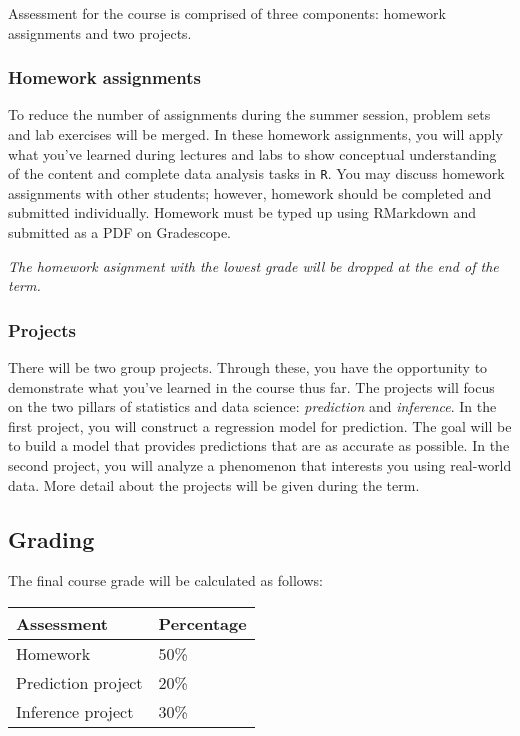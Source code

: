 \documentclass[
  letterpaper,
  DIV=11,
  numbers=noendperiod]{scrartcl}
\begin{document}
Assessment for the course is comprised of three components: homework
assignments and two projects.

\hypertarget{homework-assignments}{%
\subsubsection{Homework assignments}\label{homework-assignments}}

To reduce the number of assignments during the summer session, problem
sets and lab exercises will be merged. In these homework assignments,
you will apply what you've learned during lectures and labs to show
conceptual understanding of the content and complete data analysis tasks
in \texttt{R}. You may discuss homework assignments with other students;
however, homework should be completed and submitted individually.
Homework must be typed up using RMarkdown and submitted as a PDF on
Gradescope.

\emph{The homework asignment with the lowest grade will be dropped at
the end of the term.}

\hypertarget{projects}{%
\subsubsection{Projects}\label{projects}}

There will be two group projects. Through these, you have the
opportunity to demonstrate what you've learned in the course thus far.
The projects will focus on the two pillars of statistics and data
science: \emph{prediction} and \emph{inference}. In the first project,
you will construct a regression model for prediction. The goal will be
to build a model that provides predictions that are as accurate as
possible. In the second project, you will analyze a phenomenon that
interests you using real-world data. More detail about the projects will
be given during the term.

\hypertarget{grading}{%
\subsection{Grading}\label{grading}}

The final course grade will be calculated as follows:

\begin{longtable}[]{@{}ll@{}}
\toprule
Assessment & Percentage \\
\midrule
\endhead
Homework & 50\% \\
Prediction project & 20\% \\
Inference project & 30\% \\
\bottomrule
\end{longtable}
\end{document}
